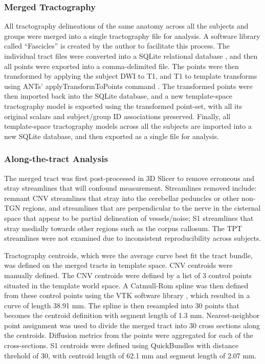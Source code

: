 \subsubsection{Merged Tractography}
All tractography delineations of the same anatomy across all the subjects and groups were merged into a single tractography file for analysis. A software library called “Fascicles” is created by the author to facilitate this process. The individual tract files were converted into a SQLite relational database \cite{owens2010sqlite}, and then all points were exported into a comma-delimited file. The points were then transformed by applying the subject DWI to T1, and T1 to template transforms using ANTs’  applyTransformToPoints command \cite{Avants2009}. The transformed points were then imported back into the SQLite database, and a new template-space tractography model is exported using the transformed point-set, with all its original scalars and subject/group ID associations preserved. Finally, all template-space tractography models across all the subjects are imported into a new SQLite database, and then exported as a single file for analysis. 

\subsubsection{Along-the-tract Analysis}
The merged tract was first post-processed in 3D Slicer to remove erroneous and stray streamlines that will confound measurement. Streamlines removed include: remnant CNV streamlines that stray into the cerebellar peduncles or other non-TGN regions, and streamlines that are perpendicular to the nerve in the cisternal space that appear to be partial delineation of vessels/noise; S1 streamlines that stray medially towards other regions such as the corpus callosum. The TPT streamlines were not examined due to inconsistent reproducibility across subjects. 

Tractography centroids, which were the average curve best fit the tract bundle, was defined on the merged tracts in template space. CNV centroids were manually defined. The CNV centroids were defined by a list of 3 control points situated in the template world space. A Catmull-Rom spline \cite{DeRose1988} was then defined from these control points using the VTK software library \cite{Schroeder2005}, which resulted in a curve of length 38.91 mm. The spline is then resampled into 30 points that becomes the centroid definition with segment length of 1.3 mm. Nearest-neighbor point assignment was used to divide the merged tract into 30 cross sections along the centroids. Diffusion metrics from the points were aggregated for each of the cross-sections.  S1 centroids were defined using QuickBundles \cite{Garyfallidis2012} with distance threhold of 30, with centroid length of 62.1 mm and segment length of 2.07 mm. 

